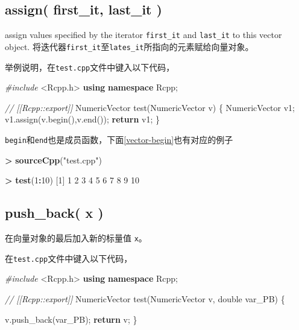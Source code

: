 \documentclass[]{ctexbook}
\newenvironment{Shaded}{\begin{snugshade}}{\end{snugshade}}
\newcommand{\KeywordTok}[1]{\textcolor[rgb]{0.13,0.29,0.53}{\textbf{#1}}}
\newcommand{\DataTypeTok}[1]{\textcolor[rgb]{0.13,0.29,0.53}{#1}}
\newcommand{\DecValTok}[1]{\textcolor[rgb]{0.00,0.00,0.81}{#1}}
\newcommand{\StringTok}[1]{\textcolor[rgb]{0.31,0.60,0.02}{#1}}
\newcommand{\ImportTok}[1]{#1}
\newcommand{\CommentTok}[1]{\textcolor[rgb]{0.56,0.35,0.01}{\textit{#1}}}
\newcommand{\ControlFlowTok}[1]{\textcolor[rgb]{0.13,0.29,0.53}{\textbf{#1}}}
\newcommand{\OperatorTok}[1]{\textcolor[rgb]{0.81,0.36,0.00}{\textbf{#1}}}
\newcommand{\PreprocessorTok}[1]{\textcolor[rgb]{0.56,0.35,0.01}{\textit{#1}}}
\newcommand{\NormalTok}[1]{#1}
\begin{document}
\subsection{assign( first\_it, last\_it
)}\label{assign-first_it-last_it}

assign values specified by the iterator \texttt{first\_it} and
\texttt{last\_it} to this vector object.
将迭代器\texttt{first\_it}至\texttt{lates\_it}所指向的元素赋给向量对象。

举例说明，在\texttt{test.cpp}文件中键入以下代码，

\begin{Shaded}
\begin{Highlighting}[]
\PreprocessorTok{#include }\ImportTok{<Rcpp.h>}
\KeywordTok{using} \KeywordTok{namespace}\NormalTok{ Rcpp;}

\CommentTok{// [[Rcpp::export]]}
\NormalTok{NumericVector test(NumericVector v) \{}
\NormalTok{  NumericVector v1;}
\NormalTok{  v1.assign(v.begin(),v.end());}
  \ControlFlowTok{return}\NormalTok{ v1;}
\NormalTok{\}}
\end{Highlighting}
\end{Shaded}

\texttt{begin}和\texttt{end}也是成员函数，下面\ref{vector-begin}也有对应的例子

\begin{Shaded}
\begin{Highlighting}[]
\OperatorTok{>}\StringTok{ }\KeywordTok{sourceCpp}\NormalTok{(}\StringTok{"test.cpp"}\NormalTok{)}

\OperatorTok{>}\StringTok{ }\KeywordTok{test}\NormalTok{(}\DecValTok{1}\OperatorTok{:}\DecValTok{10}\NormalTok{)}
\NormalTok{ [}\DecValTok{1}\NormalTok{]  }\DecValTok{1}  \DecValTok{2}  \DecValTok{3}  \DecValTok{4}  \DecValTok{5}  \DecValTok{6}  \DecValTok{7}  \DecValTok{8}  \DecValTok{9} \DecValTok{10}
\end{Highlighting}
\end{Shaded}

\subsection{push\_back( x )}\label{push-backx}

在向量对象的最后加入新的标量值 \texttt{x}。

在\texttt{test.cpp}文件中键入以下代码，

\begin{Shaded}
\begin{Highlighting}[]
\PreprocessorTok{#include }\ImportTok{<Rcpp.h>}
\KeywordTok{using} \KeywordTok{namespace}\NormalTok{ Rcpp;}

\CommentTok{// [[Rcpp::export]]}
\NormalTok{NumericVector test(NumericVector v, }\DataTypeTok{double}\NormalTok{ var_PB) \{}
  
\NormalTok{  v.push_back(var_PB);}
  \ControlFlowTok{return}\NormalTok{ v;}
\NormalTok{\}}
\end{Highlighting}
\end{Shaded}
\end{document}
